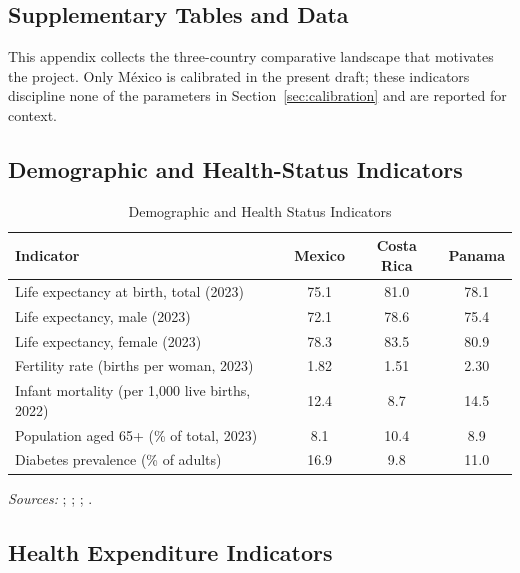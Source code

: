 \documentclass[12pt,a4paper]{article}
\begin{document}
\begin{appendices}
\section{Supplementary Tables and Data}
\label{app:supplementary}

This appendix collects the three-country comparative landscape that motivates the project. Only M\'exico is calibrated in the present draft; these indicators discipline none of the parameters in Section~\ref{sec:calibration} and are reported for context.

\subsection{Demographic and Health-Status Indicators}
\label{app:demog_table}

\begin{table}[H]
\centering
\caption{Demographic and Health Status Indicators}
\label{tab:demog}
\begin{tabular}{lccc}
\hline\hline
\textbf{Indicator} & \textbf{Mexico} & \textbf{Costa Rica} & \textbf{Panama} \\
\hline
Life expectancy at birth, total (2023)           & 75.1 & 81.0 & 78.1 \\
Life expectancy, male (2023)                     & 72.1 & 78.6 & 75.4 \\
Life expectancy, female (2023)                   & 78.3 & 83.5 & 80.9 \\
Fertility rate (births per woman, 2023)          & 1.82 & 1.51 & 2.30 \\
Infant mortality (per 1{,}000 live births, 2022) & 12.4 & 8.7  & 14.5 \\
Population aged 65+ (\% of total, 2023)          & 8.1  & 10.4 & 8.9  \\
Diabetes prevalence (\% of adults)               & 16.9 & 9.8  & 11.0 \\
\hline\hline
\end{tabular}
\begin{minipage}{\linewidth}
\smallskip
\footnotesize
\textit{Sources:} \citet{PAHOHIA2024}; \citet{WHOGHO2024};
\citet{WorldBankWDI2024}; \citet{OECDHaG2023}.
\end{minipage}
\end{table}

\subsection{Health Expenditure Indicators}
\label{app:health_table}


\end{appendices}
\end{document}

